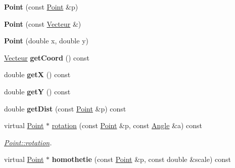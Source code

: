 \begin{DoxyCompactItemize}
\item 
\hypertarget{class_point_af0c0f20db1616447bc78184ed537ef6e}{{\bfseries Point} (const \hyperlink{class_point}{Point} \&p)}\label{class_point_af0c0f20db1616447bc78184ed537ef6e}

\item 
\hypertarget{class_point_a6761ef774ae06ee3226c8050756e0e03}{{\bfseries Point} (const \hyperlink{class_vecteur}{Vecteur} \&)}\label{class_point_a6761ef774ae06ee3226c8050756e0e03}

\item 
\hypertarget{class_point_a78b55e8d5466bb8c2cf60fa55f2562ff}{{\bfseries Point} (double x, double y)}\label{class_point_a78b55e8d5466bb8c2cf60fa55f2562ff}

\item 
\hypertarget{class_point_a4663f6c2c3c7ab8a3d675194797f91e2}{\hyperlink{class_vecteur}{Vecteur} {\bfseries get\+Coord} () const }\label{class_point_a4663f6c2c3c7ab8a3d675194797f91e2}

\item 
\hypertarget{class_point_af52a20a376f8f31e87658837565d3812}{double {\bfseries get\+X} () const }\label{class_point_af52a20a376f8f31e87658837565d3812}

\item 
\hypertarget{class_point_aac5008459bf0e0053ce744a69187bae7}{double {\bfseries get\+Y} () const }\label{class_point_aac5008459bf0e0053ce744a69187bae7}

\item 
\hypertarget{class_point_ac585bbd5c399089f595c08549fb14181}{double {\bfseries get\+Dist} (const \hyperlink{class_point}{Point} \&p) const }\label{class_point_ac585bbd5c399089f595c08549fb14181}

\item 
virtual \hyperlink{class_point}{Point} $\ast$ \hyperlink{class_point_a32bc5c9d0e07f0e4b54187ffcd3c8a67}{rotation} (const \hyperlink{class_point}{Point} \&p, const \hyperlink{class_angle}{Angle} \&a) const 
\begin{DoxyCompactList}\small\item\em \hyperlink{class_point_a32bc5c9d0e07f0e4b54187ffcd3c8a67}{Point\+::rotation}. \end{DoxyCompactList}\item 
\hypertarget{class_point_adbe4e8c3740d0f3c5fc6f9911333a116}{virtual \hyperlink{class_point}{Point} $\ast$ {\bfseries homothetie} (const \hyperlink{class_point}{Point} \&p, const double \&scale) const }\label{class_point_adbe4e8c3740d0f3c5fc6f9911333a116}


\end{DoxyCompactItemize}
